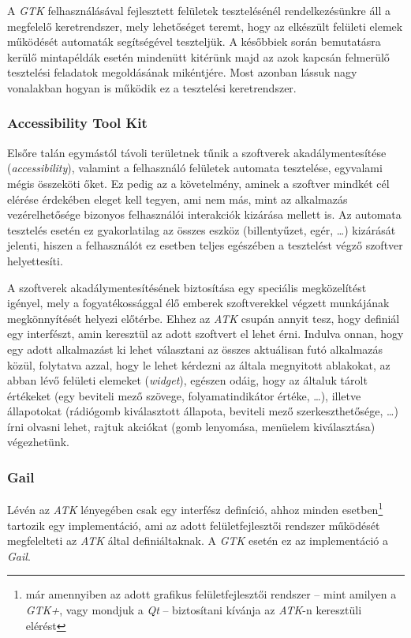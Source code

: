 A \textit{GTK} felhasználásával fejlesztett felületek tesztelésénél rendelkezésünkre áll a megfelelő keretrendszer, mely lehetőséget teremt, hogy az elkészült felületi elemek működését automaták segítségével teszteljük. A későbbiek során bemutatásra kerülő mintapéldák esetén mindenütt kitérünk majd az azok kapcsán felmerülő tesztelési feladatok megoldásának mikéntjére. Most azonban lássuk nagy vonalakban hogyan is működik ez a tesztelési keretrendszer.

\subsubsection{Accessibility Tool Kit}
\label{sec:atk}

Elsőre talán egymástól távoli területnek tűnik a szoftverek akadálymentesítése (\textit{accessibility}), valamint a felhasználó felületek automata tesztelése, egyvalami mégis összeköti őket. Ez pedig az a követelmény, aminek a szoftver mindkét cél elérése érdekében eleget kell tegyen, ami nem más, mint az alkalmazás vezérelhetősége bizonyos felhasználói interakciók kizárása mellett is. Az automata tesztelés esetén ez gyakorlatilag az összes eszköz (billentyűzet, egér, \dots) kizárását jelenti, hiszen a felhasználót ez esetben teljes egészében a tesztelést végző szoftver helyettesíti.

A szoftverek akadálymentesítésének biztosítása egy speciális megközelítést igényel, mely a fogyatékossággal élő emberek szoftverekkel végzett munkájának megkönnyítését helyezi előtérbe. Ehhez az \textit{ATK} csupán annyit tesz, hogy definiál egy interfészt, amin keresztül az adott szoftvert el lehet érni. Indulva onnan, hogy egy adott alkalmazást ki lehet választani az összes aktuálisan futó alkalmazás közül, folytatva azzal, hogy le lehet kérdezni az általa megnyitott ablakokat, az abban lévő felületi elemeket (\textit{widget}), egészen odáig, hogy az általuk tárolt értékeket (egy beviteli mező szövege, folyamatindikátor értéke, \dots), illetve állapotokat (rádiógomb kiválasztott állapota, beviteli mező szerkeszthetősége, \dots) írni olvasni lehet, rajtuk akciókat (gomb lenyomása, menüelem kiválasztása) végezhetünk.

\subsubsection{Gail}
\label{sec:gail}

Lévén az \textit{ATK} lényegében csak egy interfész definíció, ahhoz minden esetben\footnote{már amennyiben az adott grafikus felületfejlesztői rendszer -- mint amilyen a \textit{GTK+}, vagy mondjuk a \textit{Qt} -- biztosítani kívánja az \textit{ATK}-n keresztüli elérést} tartozik egy implementáció, ami az adott felületfejlesztői rendszer működését megfelelteti az \textit{ATK} által definiáltaknak. A \textit{GTK}  esetén ez az implementáció a \textit{Gail}.

